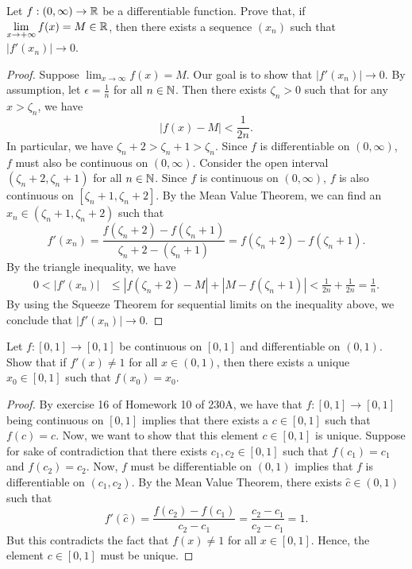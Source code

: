 \documentclass[a4paper]{article}
\begin{document}
\begin{problem}
    Let \( f: (0,\infty ) \to \mathbb{R} \) be a differentiable function. Prove that, if \( \lim_{ x \to  + \infty   }  f(x) = M  \in \R  \), then there exists a sequence \( ({x}_{n}) \) such that \( | f'({x}_{n}) | \to 0 \).
\end{problem}
\begin{proof}
    Suppose \( \lim_{ x \to \infty  }  f(x) = M  \). Our goal is to show that \( | f'({x}_{n}) | \to 0  \). By assumption, let \( \epsilon = \frac{ 1 }{ n }  \) for all \( n \in \mathbb{N}  \). Then there exists \( {\zeta}_{n} > 0  \) such that for any \( x > {\zeta}_{n} \), we have 
    \[  | f(x) - M  |  < \frac{ 1 }{ 2n }. \]
    In particular, we have \( {\zeta}_{n} + 2 > {\zeta}_{n} + 1 > {\zeta}_{n} \). Since \( f \) is differentiable on \( (0,\infty ) \), \( f  \) must also be continuous on \( (0,\infty ) \). Consider the open interval \( ({\zeta}_{n} + 2, {\zeta}_{n}+1) \) for all \( n \in \mathbb{N} \). Since \( f \) is continuous on \( (0,\infty ) \), \( f  \) is also continuous on \( [{\zeta}_{n} + 1, {\zeta}_{n} + 2 ] \).  By the Mean Value Theorem, we can find an \( {x}_{n} \in ({\zeta}_{n} + 1, {\zeta}_{n} + 2) \) such that 
    \[  f'({x}_{n}) = \frac{ f({\zeta}_{n}+2) - f({\zeta}_{n} + 1) }{ {\zeta}_{n} + 2 - ({\zeta}_{n} + 1) }  = f({\zeta}_{n} + 2) - f({\zeta}_{n} + 1). \]
    By the triangle inequality, we have
    \begin{align*}
         0 < | f'({x}_{n}) | &\leq | f({\zeta}_{n} + 2) - M  |  + | M - f({\zeta}_{n} + 1) |  
                        < \frac{ 1 }{ 2n }  + \frac{ 1 }{ 2n }  
                        = \frac{ 1 }{ n }.
    \end{align*}
    By using the Squeeze Theorem for sequential limits on the inequality above, we conclude that \( | f'({x}_{n}) | \to 0  \).

\end{proof}

\begin{problem}
    Let \( f: [0,1] \to [0,1] \) be continuous on \( [0,1] \) and differentiable on \( (0,1) \). Show that if \( f'(x) \neq 1  \) for all \( x \in (0,1) \), then there exists a unique \( {x}_{0} \in [0,1] \) such that \( f({x}_{0}) = {x}_{0} \).
\end{problem}
\begin{proof}
    By exercise 16 of Homework 10 of 230A, we have that \( f: [0,1] \to [0,1] \) being continuous on \( [0,1] \) implies that there exists a \( c \in [0,1] \) such that \( f(c) = c  \). Now, we want to show that this element \( c \in [0,1] \) is unique. Suppose for sake of contradiction that there exists \( {c}_{1}, {c}_{2} \in [0,1] \) such that \( f({c}_{1}) = {c}_{1} \) and \( f({c}_{2}) = {c}_{2} \). Now, \( f  \) must be differentiable on \( (0,1)  \) implies that \( f  \) is differentiable on \( ({c}_{1}, {c}_{2}) \). By the Mean Value Theorem, there exists \( \hat{c} \in (0,1) \) such that 
    \[  f'(\hat{c}) = \frac{ f({c}_{2}) - f({c}_{1}) }{ {c}_{2} - {c}_{1} }  = \frac{ {c}_{2} - {c}_{1}  }{  {c}_{2} - {c}_{1} }  =  1. \]
    But this contradicts the fact that \( f(x) \neq 1  \) for all \( x \in [0,1] \). Hence, the element \( c \in [0,1] \) must be unique.
\end{proof}
\end{document}
